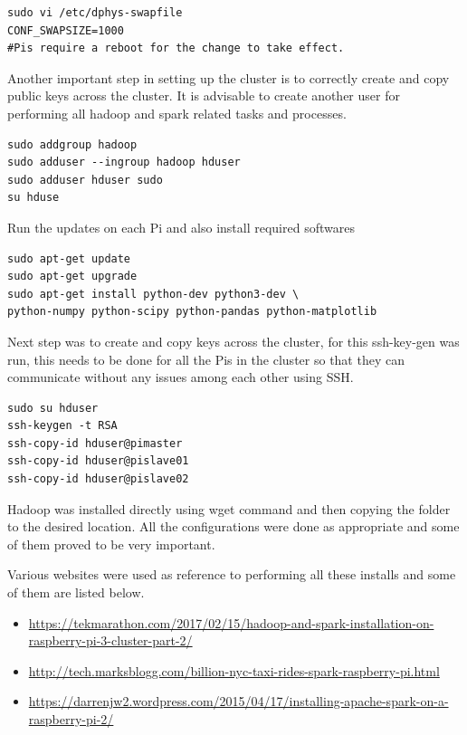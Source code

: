\begin{verbatim}
sudo vi /etc/dphys-swapfile
CONF_SWAPSIZE=1000
#Pis require a reboot for the change to take effect.
\end{verbatim}

Another important step in setting up the cluster is to correctly create and copy public keys across the cluster. It is advisable to create another user for performing all hadoop and spark related tasks and processes.

\begin{verbatim}
sudo addgroup hadoop
sudo adduser --ingroup hadoop hduser
sudo adduser hduser sudo
su hduse
\end{verbatim}

Run the updates on each Pi and also install required softwares

\begin{verbatim}
sudo apt-get update
sudo apt-get upgrade
sudo apt-get install python-dev python3-dev \
python-numpy python-scipy python-pandas python-matplotlib
\end{verbatim}

Next step was to create and copy keys across the cluster, for this ssh-key-gen was run, this needs to be done for all the Pis in the cluster so that they can communicate without any issues among each other using SSH.

\begin{verbatim}
sudo su hduser
ssh-keygen -t RSA
ssh-copy-id hduser@pimaster
ssh-copy-id hduser@pislave01
ssh-copy-id hduser@pislave02
\end{verbatim}

Hadoop was installed directly using wget command and then copying the folder to the desired location.
All the configurations were done as appropriate and some of them proved to be very important.

Various websites were used as reference to performing all these installs and some of them are listed below.

\begin{itemize}
\item 
\url{https://tekmarathon.com/2017/02/15/hadoop-and-spark-installation-on-raspberry-pi-3-cluster-part-2/}
\item \url{http://tech.marksblogg.com/billion-nyc-taxi-rides-spark-raspberry-pi.html}
\item \url{https://darrenjw2.wordpress.com/2015/04/17/installing-apache-spark-on-a-raspberry-pi-2/}
\end{itemize}

